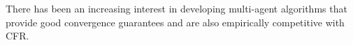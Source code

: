 There has been an increasing interest in developing multi-agent algorithms that provide good convergence guarantees 
and are also empirically competitive with CFR.

